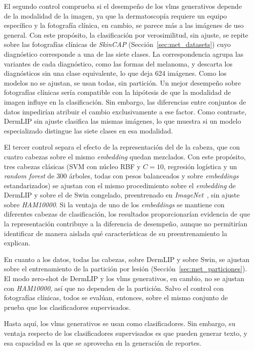 El segundo control comprueba si el desempeño de los \glspl{vlm} generativos depende de la modalidad de la imagen, ya
que la dermatoscopía requiere un equipo específico y la fotografía clínica, en cambio, se parece más a las imágenes
de uso general. Con este propósito, la clasificación por verosimilitud, sin ajuste, se repite sobre las fotografías
clínicas de \emph{SkinCAP} (Sección~\ref{sec:met_datasets}) cuyo diagnóstico corresponde a una de las siete clases. La
correspondencia agrupa las variantes de cada diagnóstico, como las formas del melanoma, y descarta los diagnósticos
sin una clase equivalente, lo que deja 624 imágenes. Como los modelos no se ajustan, se usan todas, sin partición.
Un mejor desempeño sobre fotografías clínicas sería compatible con la hipótesis de que la modalidad de imagen influye en la clasificación. Sin embargo, las diferencias entre conjuntos de datos impedirían atribuir el cambio exclusivamente a ese factor. Como contraste, DermLIP sin ajuste clasifica las mismas imágenes, lo que muestra si un
modelo especializado distingue las siete clases en esa modalidad.

El tercer control separa el efecto de la representación del de la cabeza, que con cuatro cabezas sobre el mismo
\emph{embedding} quedan mezclados. Con este propósito, tres cabezas clásicas (SVM con núcleo RBF y $C = 10$, regresión
logística y un \emph{random forest} de 300 árboles, todas con pesos balanceados y sobre \emph{embeddings}
estandarizados) se ajustan con el mismo procedimiento sobre el \emph{embedding} de DermLIP y sobre el de Swin
congelado, preentrenado en \emph{ImageNet}~\cite{liu2021swin}, sin ajuste sobre \emph{HAM10000}. Si la ventaja de uno de los \emph{embeddings} se mantiene con diferentes cabezas de clasificación, los resultados proporcionarían evidencia de que la representación contribuye a la diferencia de desempeño, aunque no permitirían identificar de manera aislada qué características de su preentrenamiento la explican.

En cuanto a los datos, todas las cabezas, sobre DermLIP y sobre Swin, se ajustan sobre el entrenamiento de la
partición por lesión (Sección~\ref{sec:met_particiones}). El modo zero-shot de DermLIP y los \glspl{vlm} generativos,
en cambio, no se ajustan con \emph{HAM10000}, así que no dependen de la partición. Salvo el control con fotografías clínicas, todos se
evalúan, entonces, sobre el mismo conjunto de prueba que los clasificadores supervisados.

Hasta aquí, los \glspl{vlm} generativos se usan como clasificadores. Sin embargo, su ventaja respecto de los
clasificadores supervisados es que pueden generar texto, y esa capacidad es la que se aprovecha en la generación de
reportes.
